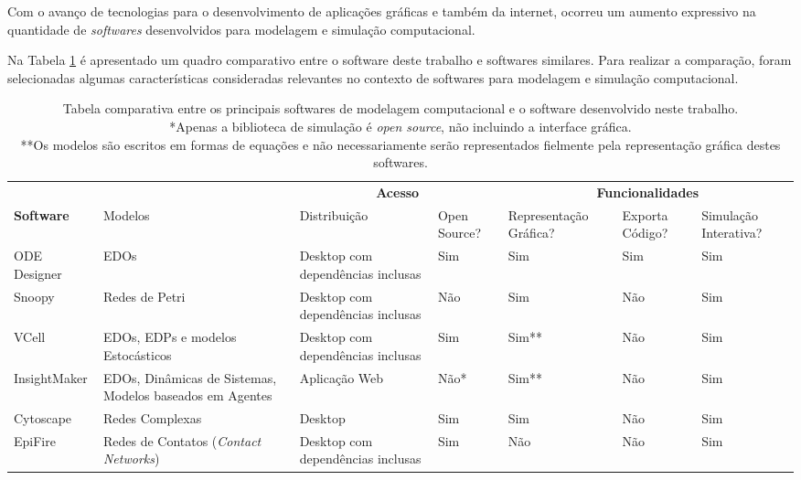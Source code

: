 \documentclass[
	12pt,				%
	openright,			%
	oneside,			%
	a4paper,			%
	main=brazil,
	english,			%
	]{ufsj-abntex2}
\begin{document}
Com o avanço de tecnologias para o desenvolvimento de aplicações gráficas e também da internet, ocorreu um aumento expressivo na quantidade de \textit{softwares} desenvolvidos para modelagem e simulação computacional. 

Na Tabela \ref{tab:comparativo} é apresentado um quadro comparativo entre o software deste trabalho e softwares similares. Para realizar a comparação, foram selecionadas algumas características consideradas relevantes no contexto de softwares para modelagem e simulação computacional. 

\begin{landscape}
\begin{table}[h]
    \centering
        \begin{tabular}{m{}m{}m{}m{}m{}m{}m{}}
        \toprule
        \multicolumn{1}{c}{} & \multicolumn{1}{c}{} & \multicolumn{2}{c}{\textbf{Acesso}} & \multicolumn{3}{c}{\textbf{Funcionalidades}} \\
        \cmidrule(rl){3-4}\cmidrule(rl){5-7}
        \textbf{Software} & {Modelos} & {Distribuição} & {Open Source?} & {Representação Gráfica?} & {Exporta Código?} & {Simulação Interativa?} \\
        \midrule
        ODE Designer & EDOs & Desktop com dependências inclusas & Sim & Sim & Sim & Sim \\
        Snoopy & Redes de Petri & Desktop com dependências inclusas & Não & Sim & Não & Sim \\
        VCell & EDOs, EDPs e modelos Estocásticos & Desktop com dependências inclusas & Sim & Sim** & Não & Sim \\
        InsightMaker & EDOs, Dinâmicas de Sistemas, Modelos baseados em Agentes & Aplicação Web & Não* & Sim** & Não & Sim \\
        Cytoscape & Redes Complexas & Desktop & Sim & Sim & Não & Sim \\
        EpiFire & Redes de Contatos (\textit{Contact Networks}) & Desktop com dependências inclusas & Sim & Não & Não & Sim \\
        \bottomrule
    \end{tabular}
    \caption{Tabela comparativa entre os principais softwares de modelagem computacional e o software desenvolvido neste trabalho. \\ *Apenas a biblioteca de simulação é \textit{open source}, não incluindo a interface gráfica. \\ **Os modelos são escritos em formas de equações e não necessariamente serão representados fielmente pela representação gráfica destes softwares.}
    \label{tab:comparativo}
\end{table}
\end{landscape}
\end{document}
